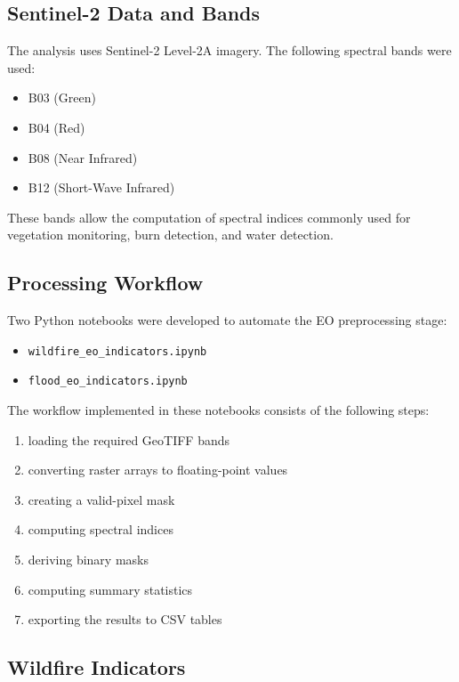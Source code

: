 \documentclass[11pt,a4paper]{article}
\begin{document}
\subsection{Sentinel-2 Data and Bands}

The analysis uses Sentinel-2 Level-2A imagery. The following spectral bands were used:

\begin{itemize}
\item B03 (Green)
\item B04 (Red)
\item B08 (Near Infrared)
\item B12 (Short-Wave Infrared)
\end{itemize}

These bands allow the computation of spectral indices commonly used for vegetation monitoring, burn detection, and water detection.

\subsection{Processing Workflow}

Two Python notebooks were developed to automate the EO preprocessing stage:

\begin{itemize}
\item \texttt{wildfire\_eo\_indicators.ipynb}
\item \texttt{flood\_eo\_indicators.ipynb}
\end{itemize}

The workflow implemented in these notebooks consists of the following steps:

\begin{enumerate}
\item loading the required GeoTIFF bands
\item converting raster arrays to floating-point values
\item creating a valid-pixel mask
\item computing spectral indices
\item deriving binary masks
\item computing summary statistics
\item exporting the results to CSV tables
\end{enumerate}

\subsection{Wildfire Indicators}
\end{document}
